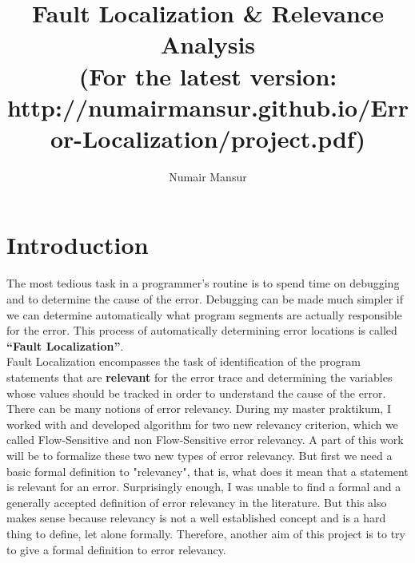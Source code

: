 \documentclass{article}
\title{Fault Localization \& Relevance Analysis \\ {\tiny (For the latest version: http://numairmansur.github.io/Error-Localization/project.pdf)}}
\author{Numair Mansur}
\begin{document}
\maketitle
\section{Introduction}
The most tedious task in a programmer’s routine is to spend time on debugging and to determine the cause of the error. Debugging can be made much simpler if we can determine automatically what program segments are actually responsible for the error. This process of automatically determining error locations is called \textbf{“Fault Localization”}.
\\
Fault Localization encompasses the task of identification of the program statements that are \textbf{relevant} for the error trace and determining the variables whose values should be tracked in order to understand the cause of the error. 
 \\
There can be many notions of error relevancy. During my master praktikum, I worked with and developed algorithm for two new relevancy criterion, which we called Flow-Sensitive and non Flow-Sensitive error relevancy. A part of this work will be to formalize these two new types of error relevancy. But first we need a basic formal definition to "relevancy", that is, what does it mean that a statement is relevant for an error. Surprisingly enough, I was unable to find a formal and a generally accepted definition of error relevancy in the literature. But this also makes sense because relevancy is not a well established concept and is a hard thing to define, let alone formally. Therefore, another aim of this project is to try to give a formal definition to error relevancy.
\end{document}
